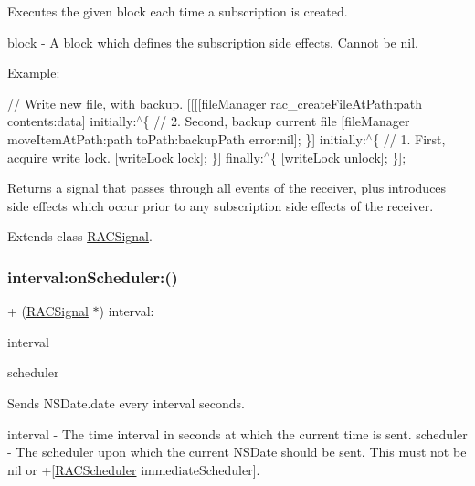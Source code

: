 Executes the given block each time a subscription is created.

block -\/ A block which defines the subscription side effects. Cannot be {\ttfamily nil}.

Example\+:

// Write new file, with backup. \mbox{[}\mbox{[}\mbox{[}\mbox{[}file\+Manager rac\+\_\+create\+File\+At\+Path\+:path contents\+:data\mbox{]} initially\+:$^\wedge$\{ // 2. Second, backup current file \mbox{[}file\+Manager move\+Item\+At\+Path\+:path to\+Path\+:backup\+Path error\+:nil\mbox{]}; \}\mbox{]} initially\+:$^\wedge$\{ // 1. First, acquire write lock. \mbox{[}write\+Lock lock\mbox{]}; \}\mbox{]} finally\+:$^\wedge$\{ \mbox{[}write\+Lock unlock\mbox{]}; \}\mbox{]};

Returns a signal that passes through all events of the receiver, plus introduces side effects which occur prior to any subscription side effects of the receiver. 

Extends class \mbox{\hyperlink{interface_r_a_c_signal_a2c8566a5d3b5997357d34ee5991a2e0c}{R\+A\+C\+Signal}}.

\mbox{\label{category_r_a_c_signal_07_operations_08_a65442f423ebf08b9217f7bb206780a45}} 
\subsubsection{\texorpdfstring{interval\+:on\+Scheduler\+:()}{interval:onScheduler:()}\hspace{0.1cm}{\footnotesize\ttfamily [1/3]}}
{\footnotesize\ttfamily + (\mbox{\hyperlink{interface_r_a_c_signal}{R\+A\+C\+Signal}} $\ast$) interval\+: \begin{DoxyParamCaption}\item[{(N\+S\+Time\+Interval)}]{interval }\item[{onScheduler:(\mbox{\hyperlink{interface_r_a_c_scheduler}{R\+A\+C\+Scheduler}} $\ast$)}]{scheduler }\end{DoxyParamCaption}}

Sends N\+S\+Date.\+date every {\ttfamily interval} seconds.

interval -\/ The time interval in seconds at which the current time is sent. scheduler -\/ The scheduler upon which the current N\+S\+Date should be sent. This must not be nil or +\mbox{[}\mbox{\hyperlink{interface_r_a_c_scheduler}{R\+A\+C\+Scheduler}} immediate\+Scheduler\mbox{]}.

